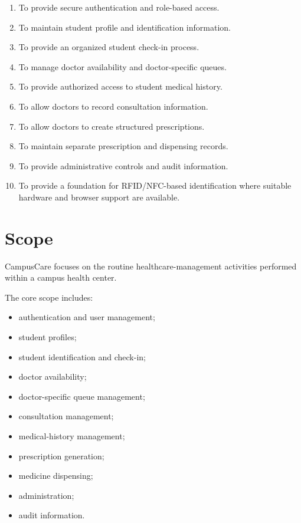\documentclass{tietreport}
\begin{document}
\begin{enumerate}
    \item To provide secure authentication and role-based access.
    
    \item To maintain student profile and identification information.
    
    \item To provide an organized student check-in process.
    
    \item To manage doctor availability and doctor-specific queues.
    
    \item To provide authorized access to student medical history.
    
    \item To allow doctors to record consultation information.
    
    \item To allow doctors to create structured prescriptions.
    
    \item To maintain separate prescription and dispensing records.
    
    \item To provide administrative controls and audit information.
    
    \item To provide a foundation for RFID/NFC-based identification
    where suitable hardware and browser support are available.
\end{enumerate}

\section{Scope}

CampusCare focuses on the routine healthcare-management activities
performed within a campus health center.

The core scope includes:

\begin{itemize}
    \item authentication and user management;
    \item student profiles;
    \item student identification and check-in;
    \item doctor availability;
    \item doctor-specific queue management;
    \item consultation management;
    \item medical-history management;
    \item prescription generation;
    \item medicine dispensing;
    \item administration;
    \item audit information.
\end{itemize}
\end{document}
